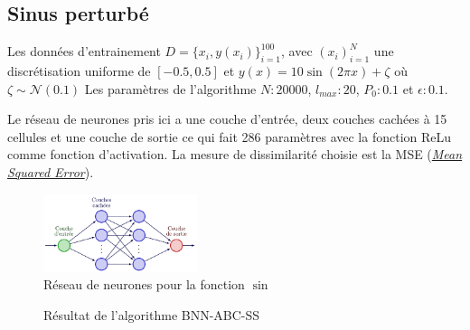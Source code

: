 \documentclass[french,12pt]{article}
\begin{document}
\subsection{Sinus perturbé}


Les données d'entrainement $D = \{x_i , y(x_i)\}_{i = 1}^{100}$, avec $(x_i)_{i = 1}^N$
une discrétisation uniforme de $[-0.5, 0.5]$ et $y(x) = 10 \sin(2 \pi x) + \zeta$ où $\zeta \sim \mathcal{N}(0.1)$
Les paramètres de l'algorithme $N : 20000$, $l_{max} : 20$, $P_0 : 0.1$ et $\epsilon : 0.1$.

Le réseau de neurones pris ici a une couche d'entrée, deux couches cachées à 15 cellules et une couche de sortie ce qui
fait 286 paramètres avec la fonction ReLu comme fonction d'activation. La mesure de dissimilarité
choisie est la MSE (\href{https://en.wikipedia.org/wiki/Mean_squared_error}{\textit{Mean Squared Error}}).


\begin{figure}[H]
    \centering
    \includegraphics[width = 0.4\textwidth]{FNN/Images/fnnSin/fnnSin_page-0001.jpg}
    \caption[short]{Réseau de neurones pour la fonction $\sin$}
\end{figure}

\begin{figure}[H]
    \centering
    \caption[short]{Résultat de l'algorithme BNN-ABC-SS}
\end{figure}
\end{document}
